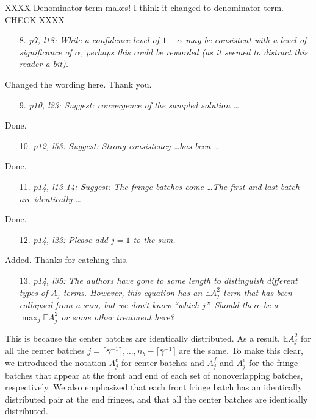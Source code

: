 \documentclass[11pt,notitlepage,onecolumn]{article}
\begin{document}
XXXX Denominator term makes!  I think it changed to denominator term. CHECK XXXX
\medskip 


\begin{itemize}
\item[8.] \textit{p7, l18: While a confidence level of $1-\alpha$ may be consistent with a level of significance of $\alpha$, perhaps this could be reworded (as it seemed to distract this reader a bit).}
\end{itemize}

\noindent  
Changed the wording here. Thank you. 
\medskip 


\begin{itemize}
\item[9.] \textit{p10, l23: Suggest: convergence of the sampled solution \ldots}
\end{itemize}

\noindent 
Done. 
\medskip 


\begin{itemize}
\item[10.] \textit{p12, l53: Suggest: Strong consistency \ldots has been \ldots}
\end{itemize}

\noindent 
Done. 
\medskip 


\begin{itemize}
\item[11.] \textit{p14, l13-14: Suggest: The fringe batches come \ldots The first and last batch are identically \ldots}
\end{itemize}

\noindent 
Done. 
\medskip 


\begin{itemize}
\item[12.] \textit{ p14, l23: Please add $j = 1$ to the sum.}
\end{itemize}

\noindent 
Added. Thanks for catching this.
\medskip 


\begin{itemize}
\item[13.] \textit{p14, l35: The authors have gone to some length to distinguish different types of $A_j$ terms.
However, this equation has an $\mathbb{E}A_j^2$ term that has been collapsed from a sum, but we don't know ``which $j$''. 
Should there be a $\max_j \mathbb{E}A_j^2$ or some other treatment here?}
\end{itemize}

\noindent 
This is because the center batches are identically distributed. 
As a result, $\mathbb{E}A_j^2$ for all the center batches $j=\lceil \bar{\gamma}^{-1} \rceil, \ldots,n_b - \lceil \bar{\gamma}^{-1} \rceil$ are the same. 
To make this clear, we introduced the notation $A_j^c$ for center batches and $A_j^f$ and $A_j^e$ for the fringe batches that appear at the front and end of each set of nonoverlapping batches, respectively. 
We also emphasized that each front fringe batch has an identically distributed pair at the end fringes, and that all the center batches are identically distributed. 
\smallskip 
\end{document}
